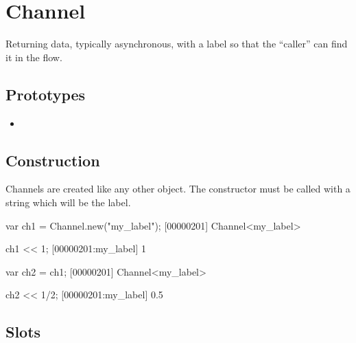 
\section{Channel}
Returning data, typically asynchronous, with a label so that the
``caller'' can find it in the flow.

\subsection{Prototypes}

\begin{itemize}
\item {}
\end{itemize}

\subsection{Construction}

Channels are created like any other object. The constructor must be
called with a string which will be the label.

\begin{urbiscript}[firstnumber=1]
var ch1 = Channel.new("my_label");
[00000201] Channel<my_label>

ch1 << 1;
[00000201:my_label] 1

var ch2 = ch1;
[00000201] Channel<my_label>

ch2 << 1/2;
[00000201:my_label] 0.5
\end{urbiscript}

\subsection{Slots}

